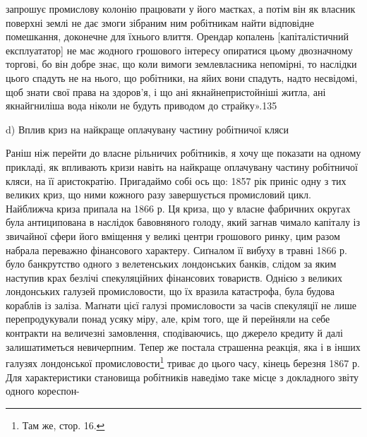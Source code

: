 \parcont{}  %
запрошує промислову колонію працювати у його маєтках, а
потім він як власник поверхні землі не дає змоги зібраним ним
робітникам найти відповідне помешкання, доконечне для їхнього
влиття. Орендар копалень [капіталістичний експлуататор] не
має жодного грошового інтересу опиратися цьому двозначному
торгові, бо він добре знає, що коли вимоги землевласника непомірні,
то наслідки цього спадуть не на нього, що робітники, на
яйих вони спадуть, надто несвідомі, щоб знати свої права на здоров’я,
і що ані якнайнепристойніші житла, ані якнайгниліша
вода ніколи не будуть приводом до страйку».135

d) Вплив криз на найкраще оплачувану
частину робітничої кляси

Раніш ніж перейти до власне рільничих робітників, я хочу
ще показати на одному прикладі, як впливають кризи навіть на
найкраще оплачувану частину робітничої кляси, на її аристократію.
Пригадаймо собі ось що: 1857 рік приніс одну з тих
великих криз, що ними кожного разу завершується промисловий
цикл. Найближча криза припала на 1866 р. Ця криза, що у власне
фабричних округах була антиципована в наслідок бавовняного
голоду, який загнав чимало капіталу із звичайної сфери його
вміщення у великі центри грошового ринку, цим разом набрала
переважно фінансового характеру. Сиґналом її вибуху в травні
1866 р. було банкрутство одного з велетенських лондонських
банків, слідом за яким наступив крах безлічі спекуляційних
фінансових товариств. Однією з великих лондонських галузей
промисловости, що їх вразила катастрофа, була будова кораблів
із заліза. Маґнати цієї галузі промисловости за часів спекуляції
не лише перепродукували понад усяку міру, але, крім
того, ще й перейняли на себе контракти на величезні замовлення,
сподіваючись, що джерело кредиту й далі залишатиметься невичерпним.
Тепер же постала страшенна реакція, яка і в інших
галузях лондонської промисловости\footnote{
Там же, стор. 16.
} триває до цього часу,
кінець березня 1867 р. Для характеристики становища робітників
наведімо таке місце з докладного звіту одного кореспон-

